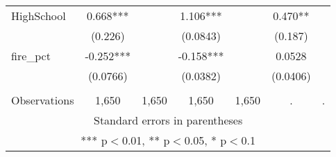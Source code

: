 \begin{tabular}{lcccccc}
HighSchool & 0.668*** &  & 1.106*** &  & 0.470** &  \\
 & (0.226) &  & (0.0843) &  & (0.187) &  \\
fire\_pct & -0.252*** &  & -0.158*** &  & 0.0528 &  \\
 & (0.0766) &  & (0.0382) &  & (0.0406) &  \\
 &  &  &  &  &  &  \\
 Observations & 1,650 & 1,650 & 1,650 & 1,650 & . & . \\ \hline
\multicolumn{7}{c}{ Standard errors in parentheses} \\
\multicolumn{7}{c}{ *** p$<$0.01, ** p$<$0.05, * p$<$0.1} \\
\end{tabular}
